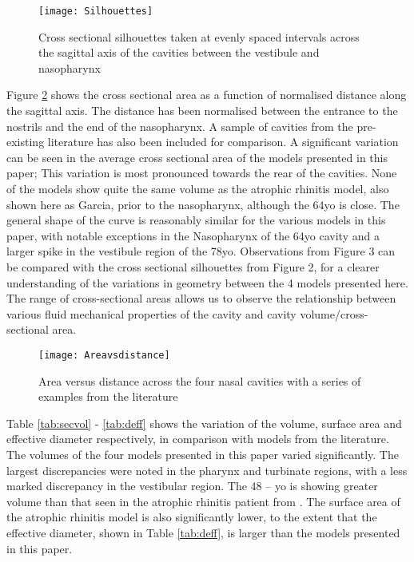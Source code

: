 \begin{figure} 
  \texttt{[image: Silhouettes]}
  \caption{Cross sectional silhouettes taken at evenly spaced intervals across the sagittal axis of  the cavities between the vestibule and nasopharynx}
  \label{fig:sil}

\end{figure}

Figure \ref{fig:area} shows the cross sectional area as a function of normalised distance along the sagittal axis. The distance has been normalised between the entrance to the nostrils and the end of the nasopharynx. A sample of cavities from the pre-existing literature has also been included for comparison. A significant variation can be seen in the average cross sectional area of the models presented in this paper; This variation is most pronounced towards the rear of the cavities. None of the models show quite the same volume as the atrophic rhinitis model, also shown here as Garcia, prior to the nasopharynx, although the 64yo is close. The general shape of the curve is reasonably similar for the various models in this paper, with notable exceptions in the Nasopharynx of the 64yo cavity and a larger spike in the vestibule region of the 78yo. Observations from Figure 3 can be compared with the cross sectional silhouettes from Figure 2, for a clearer understanding of the variations in geometry between the 4 models presented here. The range of cross-sectional areas allows us to observe the relationship between various fluid mechanical properties of the cavity and cavity volume/cross-sectional area.


\begin{figure}
  \texttt{[image: Areavsdistance]}
  \caption{Area versus distance across the four nasal cavities with a series of examples from the literature}
  \label{fig:area}
\end{figure}



Table \ref{tab:secvol} - \ref{tab:deff} shows the variation of the volume, surface area and effective diameter respectively, in comparison with models from the literature. The volumes of the four models presented in this paper varied significantly. The largest discrepancies were noted in the pharynx and turbinate regions, with a less marked discrepancy in the vestibular region. The 48 – yo is showing greater volume than that seen in the atrophic rhinitis patient from \cite{Garcia2007}. The surface area of the atrophic rhinitis model is also significantly lower, to the extent that the effective diameter, shown in Table \ref{tab:deff}, is larger than the models presented in this paper.

